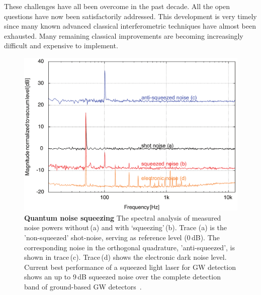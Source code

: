 These challenges have all been overcome in the past decade.  All the open questions have now been satisfactorily addressed.  This development is very timely since many known advanced classical interferometric techniques have almost been exhausted.  Many remaining classical improvements are becoming increasingly difficult and expensive to implement.

\begin{figure}
\centering
 \includegraphics[scale=.45]{./Sec_Optics/SqzAudioNew.pdf}
\caption{\textbf{Quantum noise squeezing}\; The spectral analysis of measured noise powers without\,(a) and with `squeezing'\,(b). Trace (a) is the 'non-squeezed' shot-noise, serving as reference level (0\,dB). The corresponding noise in the orthogonal quadrature, 'anti-squeezed', is shown in trace\,(c). Trace\,(d) shows the electronic dark noise level. Current best performance of a squeezed light laser for GW detection shows an up to 9\,dB squeezed noise over the complete detection band of ground-based GW detectors~\cite{VahlbruchCQG2010}.}
\label{fig:SqzAudio}
\end{figure}



